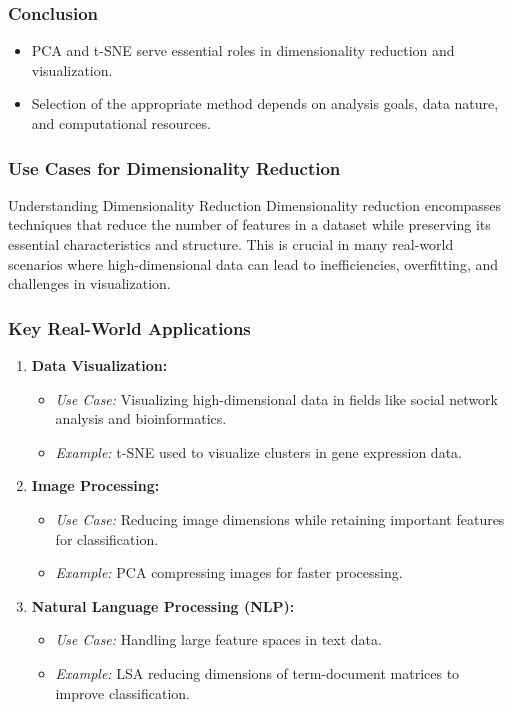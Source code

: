 \documentclass[aspectratio=169]{beamer}
\begin{document}
\begin{frame}[fragile]
    \frametitle{Conclusion}
    \begin{itemize}
        \item PCA and t-SNE serve essential roles in dimensionality reduction and visualization.
        \item Selection of the appropriate method depends on analysis goals, data nature, and computational resources.
    \end{itemize}
\end{frame}

\begin{frame}[fragile]
  \frametitle{Use Cases for Dimensionality Reduction}
  \begin{block}{Understanding Dimensionality Reduction}
    Dimensionality reduction encompasses techniques that reduce the number of features in a dataset while preserving its essential characteristics and structure. This is crucial in many real-world scenarios where high-dimensional data can lead to inefficiencies, overfitting, and challenges in visualization.
  \end{block}
\end{frame}

\begin{frame}[fragile]
  \frametitle{Key Real-World Applications}
  \begin{enumerate}
    \item \textbf{Data Visualization:}
    \begin{itemize}
      \item \textit{Use Case:} Visualizing high-dimensional data in fields like social network analysis and bioinformatics.
      \item \textit{Example:} t-SNE used to visualize clusters in gene expression data.
    \end{itemize}
    
    \item \textbf{Image Processing:}
    \begin{itemize}
      \item \textit{Use Case:} Reducing image dimensions while retaining important features for classification.
      \item \textit{Example:} PCA compressing images for faster processing.
    \end{itemize}
    
    \item \textbf{Natural Language Processing (NLP):}
    \begin{itemize}
      \item \textit{Use Case:} Handling large feature spaces in text data.
      \item \textit{Example:} LSA reducing dimensions of term-document matrices to improve classification.
    \end{itemize}
  \end{enumerate}
\end{frame}
\end{document}
